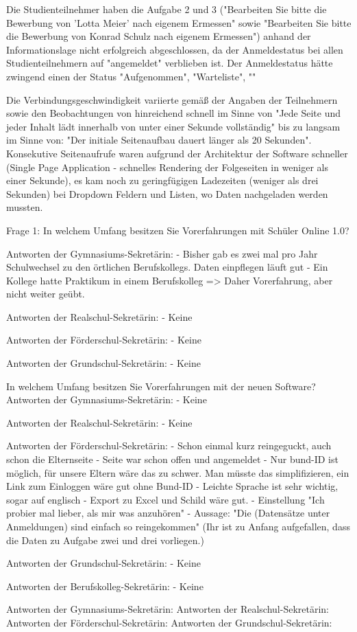 Die Studienteilnehmer haben die Aufgabe 2 und 3 ("Bearbeiten Sie bitte die Bewerbung von 'Lotta Meier' nach eigenem Ermessen" sowie "Bearbeiten Sie bitte die Bewerbung von Konrad Schulz nach eigenem Ermessen") anhand der Informationslage nicht erfolgreich abgeschlossen, da der Anmeldestatus bei allen Studienteilnehmern auf "angemeldet" verblieben ist. Der Anmeldestatus hätte zwingend einen der Status "Aufgenommen", "Warteliste", ""

Die Verbindungsgeschwindigkeit variierte gemäß der Angaben der Teilnehmern sowie den Beobachtungen von hinreichend schnell im Sinne von "Jede Seite und jeder Inhalt lädt innerhalb von unter einer Sekunde vollständig" bis zu langsam im Sinne von: "Der initiale Seitenaufbau dauert länger als 20 Sekunden". Konsekutive Seitenaufrufe waren aufgrund der Architektur der Software schneller (Single Page Application - schnelles Rendering der Folgeseiten in weniger als einer Sekunde), es kam noch zu geringfügigen Ladezeiten (weniger als drei Sekunden) bei Dropdown Feldern und Listen, wo Daten nachgeladen werden mussten.


Frage 1: In welchem Umfang besitzen Sie Vorerfahrungen mit Schüler Online 1.0? 	

Antworten der Gymnasiums-Sekretärin:
- Bisher gab es zwei mal pro Jahr Schulwechsel zu den örtlichen Berufskollegs. Daten einpflegen läuft gut
- Ein Kollege hatte Praktikum in einem Berufskolleg => Daher Vorerfahrung, aber nicht weiter geübt.

Antworten der Realschul-Sekretärin:
- Keine	

Antworten der Förderschul-Sekretärin:
- Keine

Antworten der Grundschul-Sekretärin:
- Keine


In welchem Umfang besitzen Sie Vorerfahrungen mit der neuen Software?		
Antworten der Gymnasiums-Sekretärin:
- Keine				

Antworten der Realschul-Sekretärin:
- Keine				

Antworten der Förderschul-Sekretärin:
- Schon einmal kurz reingeguckt, auch schon die Elternseite
- Seite war schon offen und angemeldet	
- Nur bund-ID ist möglich, für unsere Eltern wäre das zu schwer. Man müsste das simplifizieren, ein Link zum Einloggen wäre gut ohne Bund-ID
- Leichte Sprache ist sehr wichtig, sogar auf englisch
- Export zu Excel und Schild wäre gut.
- Einstellung "Ich probier mal lieber, als mir was anzuhören"
- Aussage: "Die (Datensätze unter Anmeldungen) sind einfach so reingekommen" (Ihr ist zu Anfang aufgefallen, dass die Daten zu Aufgabe zwei und drei vorliegen.)			

Antworten der Grundschul-Sekretärin:
- Keine		

Antworten der Berufskolleg-Sekretärin:
- Keine				







Antworten der Gymnasiums-Sekretärin:
Antworten der Realschul-Sekretärin:
Antworten der Förderschul-Sekretärin:
Antworten der Grundschul-Sekretärin: